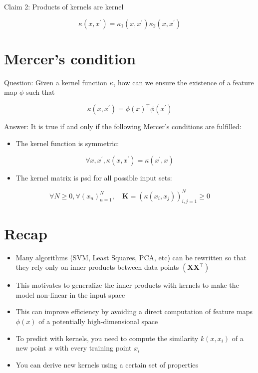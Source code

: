 \documentclass[10pt]{article}
\begin{document}
Claim 2: Products of kernels are kernel

$$
\kappa\left(x, x^{\prime}\right)=\kappa_{1}\left(x, x^{\prime}\right) \kappa_{2}\left(x, x^{\prime}\right)
$$

\section*{Mercer's condition}
Question: Given a kernel function $\kappa$, how can we ensure the existence of a feature map $\phi$ such that

$$
\kappa\left(x, x^{\prime}\right)=\phi(x)^{\top} \phi\left(x^{\prime}\right)
$$

Answer: It is true if and only if the following Mercer's conditions are fulfilled:

\begin{itemize}
  \item The kernel function is symmetric:
\end{itemize}

$$
\forall x, x^{\prime}, \kappa\left(x, x^{\prime}\right)=\kappa\left(x^{\prime}, x\right)
$$

\begin{itemize}
  \item The kernel matrix is psd for all possible input sets:
\end{itemize}

$$
\forall N \geq 0, \forall\left(x_{n}\right)_{n=1}^{N}, \quad \mathbf{K}=\left(\kappa\left(x_{i}, x_{j}\right)\right)_{i, j=1}^{N} \geqslant 0
$$

\section*{Recap}
\begin{itemize}
  \item Many algorithms (SVM, Least Squares, PCA, etc) can be rewritten so that they rely only on inner products between data points $\left(\mathbf{X X}^{\top}\right)$

  \item This motivates to generalize the inner products with kernels to make the model non-linear in the input space

  \item This can improve efficiency by avoiding a direct computation of feature maps $\phi(x)$ of a potentially high-dimensional space

  \item To predict with kernels, you need to compute the similarity $k\left(x, x_{i}\right)$ of a new point $x$ with every training point $x_{i}$

  \item You can derive new kernels using a certain set of properties

\end{itemize}
\end{document}
